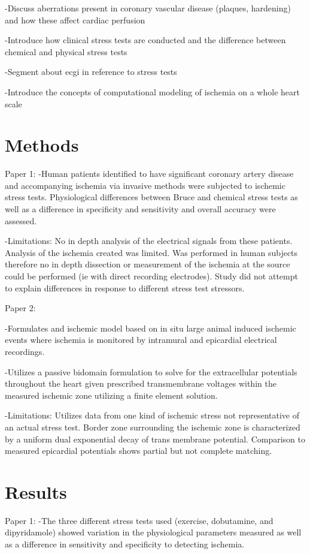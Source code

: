 \documentclass[12pt]{article}
\begin{document}
-Discuss aberrations present in coronary vascular disease (plaques, hardening) and how these affect cardiac perfusion 

-Introduce how clinical stress tests are conducted and the difference between chemical and physical stress tests

-Segment about ecgi in reference to stress tests

-Introduce the concepts of computational modeling of ischemia on a whole heart scale


\section{Methods}
Paper 1:\cite{Beleslin1994}
-Human patients identified to have significant coronary artery disease and accompanying ischemia via invasive methods were subjected to ischemic stress tests. Physiological differences between Bruce and chemical stress tests as well as a difference in specificity and sensitivity and overall accuracy were assessed. 

-Limitations: No in depth analysis of the electrical signals from these patients. Analysis of the ischemia created was limited. Was performed in human subjects therefore no in depth dissection or measurement of the ischemia at the source could be performed (ie with direct recording electrodes). Study did not attempt to explain differences in response to different stress test stressors.



Paper 2:\cite{Burton2018}

-Formulates and ischemic model based on in situ large animal induced ischemic events where ischemia is monitored by intramural and epicardial electrical recordings.

-Utilizes a passive bidomain formulation to solve for the extracellular potentials throughout the heart given prescribed transmembrane voltages within the measured ischemic zone utilizing a finite element solution. 

-Limitations: Utilizes data from one kind of ischemic stress not representative of an actual stress test. Border zone surrounding the ischemic zone is characterized by a uniform dual exponential decay of trans membrane potential. Comparison to measured epicardial potentials shows partial but not complete matching.


\section{Results}
Paper 1:
-The three different stress tests used (exercise, dobutamine, and dipyridamole) showed variation in the physiological parameters measured as well as a difference in sensitivity and specificity to detecting ischemia.
\end{document}
